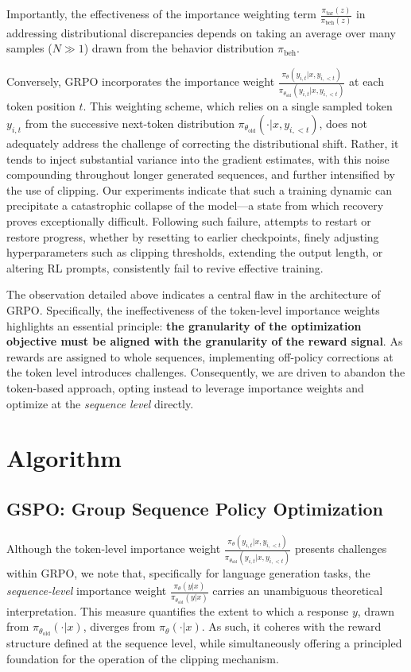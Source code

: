 Importantly, the effectiveness of the importance weighting term $\frac{ \pi_\text{tar} (z) }{ \pi_\text{beh} (z)}$ in addressing distributional discrepancies depends on taking an average over many samples ($N \gg 1$) drawn from the behavior distribution $\pi_\text{beh}$.

Conversely, GRPO incorporates the importance weight $\frac{ \pi_{\theta} (y_{i,t} | x, y_{i,<t}) }{ \pi_{\theta_\text{old}} (y_{i,t} | x,y_{i,<t})}$ at each token position $t$. This weighting scheme, which relies on a single sampled token $y_{i,t}$ from the successive next-token distribution $\pi_{\theta_\text{old}}( \cdot | x, y_{i, <t})$, does not adequately address the challenge of correcting the distributional shift. Rather, it tends to inject substantial variance into the gradient estimates, with this noise compounding throughout longer generated sequences, and further intensified by the use of clipping. Our experiments indicate that such a training dynamic can precipitate a catastrophic collapse of the model—a state from which recovery proves exceptionally difficult. Following such failure, attempts to restart or restore progress, whether by resetting to earlier checkpoints, finely adjusting hyperparameters such as clipping thresholds, extending the output length, or altering RL prompts, consistently fail to revive effective training.

The observation detailed above indicates a central flaw in the architecture of GRPO. Specifically, the ineffectiveness of the token-level importance weights highlights an essential principle: \textbf{the granularity of the optimization objective must be aligned with the granularity of the reward signal}. As rewards are assigned to whole sequences, implementing off-policy corrections at the token level introduces challenges. Consequently, we are driven to abandon the token-based approach, opting instead to leverage importance weights and optimize at the \textit{sequence level} directly.

\section{Algorithm}

\subsection{GSPO: Group Sequence Policy Optimization}

Although the token-level importance weight $\frac{ \pi_{\theta} (y_{i,t} | x, y_{i,<t}) }{ \pi_{\theta_\text{old}} (y_{i,t} | x,y_{i,<t})}$ presents challenges within GRPO, we note that, specifically for language generation tasks, the \textit{sequence-level} importance weight $\frac{ \pi_{\theta} (y | x) }{ \pi_{\theta_\text{old}} (y | x)}$ carries an unambiguous theoretical interpretation. This measure quantifies the extent to which a response $y$, drawn from $\pi_{\theta_\text{old}} (\cdot | x)$, diverges from $\pi_{\theta} (\cdot | x)$. As such, it coheres with the reward structure defined at the sequence level, while simultaneously offering a principled foundation for the operation of the clipping mechanism.

